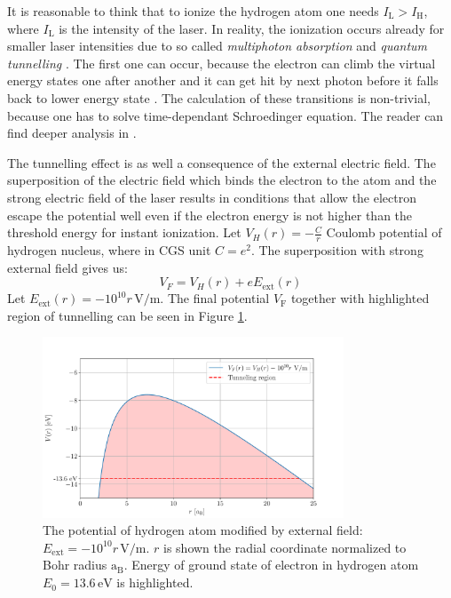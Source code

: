 It is reasonable to think that to ionize the hydrogen atom one needs $I_\mathrm{L}>I_{\mathrm{H}}$, where $I_{\mathrm{L}}$ is the intensity of the laser. In reality, the ionization occurs already for smaller laser intensities due to so called \textit{multiphoton absorption} \cite{plasma-intro} and \textit{quantum tunnelling} \cite{laser-plasma1}. The first one can occur, because the electron can climb the virtual energy states one after another and it can get hit by next photon before it falls back to lower energy state \cite{laser-plasma1}. The calculation of these transitions is non-trivial, because one has to solve time-dependant Schroedinger equation. The reader can find deeper analysis in \cite{atoms-in-lasers}.

The tunnelling effect is as well a consequence of the external electric field. The superposition of the electric field which binds the electron to the atom and the strong electric field of the laser results in conditions that allow the electron escape the potential well even if the electron energy is not higher than the threshold energy for instant ionization. Let $V_H(r)= -\frac{C}{r}$ Coulomb potential of hydrogen nucleus, where in CGS unit $C = e^2$. The superposition with strong external field gives us:
\begin{equation}
	V_F = V_H(r) + eE_{\mathrm{ext}}(r)
\end{equation}
Let $E_{\mathrm{ext}}(r) = -10^{10}r\,\mathrm{V/m}$. The final potential $V_\mathrm{F}$ together with highlighted region of tunnelling can be seen in Figure \ref{fig:tunnelling}. 

\begin{figure}[h]
	\centering
	\includegraphics[width=0.8\textwidth]{figures/tunnelling}
	\caption{The potential of hydrogen atom modified by external field: $E_{\mathrm{ext}} = -10^{10}r\,\mathrm{V/m}$. $r$ is shown the radial coordinate normalized to Bohr radius $\mathrm{a_B}$. Energy of ground state of electron in hydrogen atom $E_0 = 13.6\, \mathrm{eV}$ is highlighted.}
	\label{fig:tunnelling}
\end{figure}

